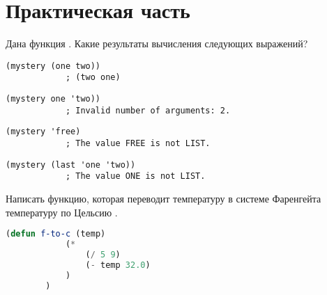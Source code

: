 \documentclass[a4paper,oneside,12pt]{extreport}
\begin{document}


\section*{Практическая часть}

\begin{task}
	Дана функция .
	Какие результаты вычисления следующих выражений?
	\begin{AutoMultiColEnumerate}
		\item \begin{lstlisting}[style=lispinline, gobble=24]
			(mystery (one two))
			; (two one)
		\end{lstlisting}

		\item \begin{lstlisting}[style=lispinline, gobble=24]
			(mystery one 'two))
			; Invalid number of arguments: 2.
		\end{lstlisting}

		\item \begin{lstlisting}[style=lispinline, gobble=24]
			(mystery 'free)
			; The value FREE is not LIST.
		\end{lstlisting}

		\item \begin{lstlisting}[style=lispinline, gobble=24]
			(mystery (last 'one 'two))
			; The value ONE is not LIST.
		\end{lstlisting}
	\end{AutoMultiColEnumerate}
\end{task}

\begin{task}
	Написать функцию, которая переводит температуру в системе Фаренгейта температуру по Цельсию .

	\begin{lstlisting}[language=Lisp, gobble=16]
		(defun f-to-c (temp)
			(*
				(/ 5 9)
				(- temp 32.0)
			)
		)
	\end{lstlisting}
\end{task}
\end{document}
